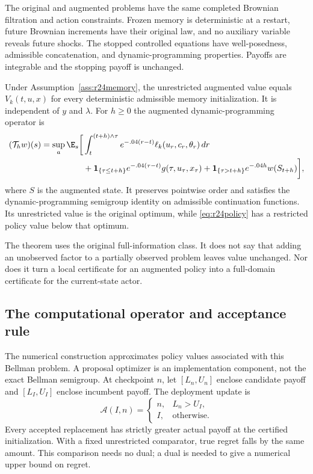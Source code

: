 \begin{assumption}\label{ass:r24memory}
The original and augmented problems have the same completed Brownian filtration and action constraints. Frozen memory is deterministic at a restart, future Brownian increments have their original law, and no auxiliary variable reveals future shocks. The stopped controlled equations have well-posedness, admissible concatenation, and dynamic-programming properties. Payoffs are integrable and the stopping payoff is unchanged.
\end{assumption}
\begin{theorem}\label{thm:r24value}
Under Assumption~\ref{ass:r24memory}, the unrestricted augmented value equals $V_k(t,u,x)$ for every deterministic admissible memory initialization. It is independent of $y$ and $\lambda$. For $h\geq0$ the augmented dynamic-programming operator is
\begin{align}
 (\mathcal T_h w)(s)=\sup_a\E_s\bigg[&\int_t^{(t+h)\wedge\tau}e^{-.04(r-t)}\ell_k(u_r,c_r,\theta_r)\,dr\notag\\
 &+\mathbf1_{\{\tau\leq t+h\}}e^{-.04(\tau-t)}g(\tau,u_\tau,x_\tau)
 +\mathbf1_{\{\tau>t+h\}}e^{-.04h}w(S_{t+h})\bigg],
 \label{eq:r24semigroup}
\end{align}
where $S$ is the augmented state. It preserves pointwise order and satisfies the dynamic-programming semigroup identity on admissible continuation functions. Its unrestricted value is the original optimum, while \eqref{eq:r24policy} has a restricted policy value below that optimum.
\end{theorem}
The theorem uses the original full-information class. It does not say that adding an unobserved factor to a partially observed problem leaves value unchanged. Nor does it turn a local certificate for an augmented policy into a full-domain certificate for the current-state actor.

\subsection{The computational operator and acceptance rule}
The numerical construction approximates policy values associated with this Bellman problem. A proposal optimizer is an implementation component, not the exact Bellman semigroup. At checkpoint $n$, let $[L_n,U_n]$ enclose candidate payoff and $[L_I,U_I]$ enclose incumbent payoff. The deployment update is
\begin{equation}
 \mathcal A(I,n)=\begin{cases}n,&L_n>U_I,\\ I,&\text{otherwise}.\end{cases}
 \label{eq:r24gate}
\end{equation}
Every accepted replacement has strictly greater actual payoff at the certified initialization. With a fixed unrestricted comparator, true regret falls by the same amount. This comparison needs no dual; a dual is needed to give a numerical upper bound on regret.

